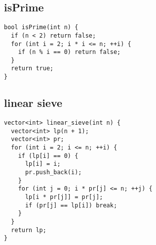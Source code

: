 \documentclass[twoside]{article}
\begin{document}
\begin{multicols*}{2}
{
\subsection*{isPrime}
}
\begin{verbatim}
bool isPrime(int n) {
  if (n < 2) return false;
  for (int i = 2; i * i <= n; ++i) {
    if (n % i == 0) return false;
  }
  return true;
}
\end{verbatim}

{
\subsection*{linear sieve}
}
\begin{verbatim}
vector<int> linear_sieve(int n) {
  vector<int> lp(n + 1);
  vector<int> pr;
  for (int i = 2; i <= n; ++i) {
    if (lp[i] == 0) {
      lp[i] = i;
      pr.push_back(i);
    }
    for (int j = 0; i * pr[j] <= n; ++j) {
      lp[i * pr[j]] = pr[j];
      if (pr[j] == lp[i]) break;
    }
  }
  return lp;
}
\end{verbatim}

{
}
\end{multicols*}
\end{document}
